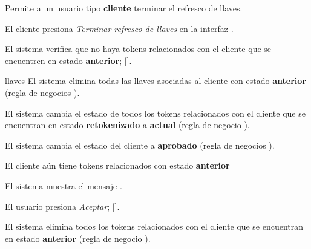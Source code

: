 %
%

{
  Permite a un usuario tipo \textbf{cliente} terminar el refresco de llaves.

  \begin{trayectoriaPrincipal}

    \item El cliente presiona \textit{Terminar refresco de llaves} en la
      interfaz .

    \item El sistema verifica que no haya tokens relacionados con el cliente
      que se encuentren en estado \textbf{anterior};
      [].

    \item[llaves] El sistema elimina todas las llaves asociadas al cliente con
      estado \textbf{anterior} (regla de negocios
      ).

    \item El sistema cambia el estado de todos los tokens relacionados con el
      cliente que se encuentran en estado \textbf{retokenizado} a
      \textbf{actual} (regla de negocio ).

    \item El sistema cambia el estado del cliente a \textbf{aprobado}
      (regla de negocios ).

  \end{trayectoriaPrincipal}


  \begin{trayectoriaAlternativa}
    {El cliente aún tiene tokens relacionados con estado \textbf{anterior}}

    \item El sistema muestra el mensaje
      .

    \item El usuario presiona \textit{Aceptar};
      [].

    \item El sistema elimina todos los tokens relacionados con el cliente que se
      encuentran en estado \textbf{anterior} (regla de negocio
      ).


\end{trayectoriaAlternativa}}
